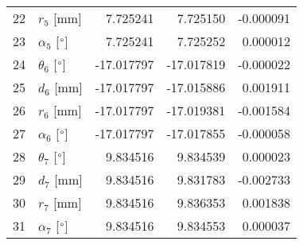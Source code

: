 \documentclass{standalone}%
\begin{document}
\begin{tabular}{llrrr}
22 &              $r_{5}$ [mm] &   7.725241 &   7.725150 &  -0.000091 \\
23 &  $\alpha_{5}$ [$\degree$] &   7.725241 &   7.725252 &   0.000012 \\
24 &  $\theta_{6}$ [$\degree$] & -17.017797 & -17.017819 &  -0.000022 \\
25 &              $d_{6}$ [mm] & -17.017797 & -17.015886 &   0.001911 \\
26 &              $r_{6}$ [mm] & -17.017797 & -17.019381 &  -0.001584 \\
27 &  $\alpha_{6}$ [$\degree$] & -17.017797 & -17.017855 &  -0.000058 \\
28 &  $\theta_{7}$ [$\degree$] &   9.834516 &   9.834539 &   0.000023 \\
29 &              $d_{7}$ [mm] &   9.834516 &   9.831783 &  -0.002733 \\
30 &              $r_{7}$ [mm] &   9.834516 &   9.836353 &   0.001838 \\
31 &  $\alpha_{7}$ [$\degree$] &   9.834516 &   9.834553 &   0.000037 \\
\bottomrule
\end{tabular}
%
\end{document}
